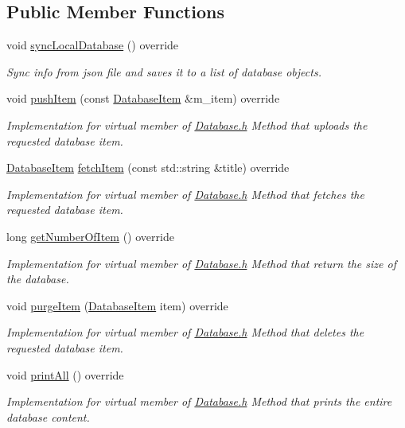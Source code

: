 \subsection*{Public Member Functions}
\begin{DoxyCompactItemize}
\item 
void \hyperlink{classMovieDatabase_aee175db6a2a357b6180fcab5d57eddd5}{sync\+Local\+Database} () override
\begin{DoxyCompactList}\small\item\em Sync info from json file and saves it to a list of database objects. \end{DoxyCompactList}\item 
void \hyperlink{classMovieDatabase_a203b9b5c1b325997ce519859a436b6ce}{push\+Item} (const \hyperlink{classDatabaseItem}{Database\+Item} \&m\+\_\+item) override
\begin{DoxyCompactList}\small\item\em Implementation for virtual member of \hyperlink{Database_8h_source}{Database.\+h} Method that uploads the requested database item. \end{DoxyCompactList}\item 
\hyperlink{classDatabaseItem}{Database\+Item} \hyperlink{classMovieDatabase_ac0bb39b8be599ffea76081809ae42dda}{fetch\+Item} (const std\+::string \&title) override
\begin{DoxyCompactList}\small\item\em Implementation for virtual member of \hyperlink{Database_8h_source}{Database.\+h} Method that fetches the requested database item. \end{DoxyCompactList}\item 
long \hyperlink{classMovieDatabase_a9a386f51dd72d63414a124cbcfcd879b}{get\+Number\+Of\+Item} () override
\begin{DoxyCompactList}\small\item\em Implementation for virtual member of \hyperlink{Database_8h_source}{Database.\+h} Method that return the size of the database. \end{DoxyCompactList}\item 
void \hyperlink{classMovieDatabase_ad3ce59d0fa7f64937085e7504bd3b85a}{purge\+Item} (\hyperlink{classDatabaseItem}{Database\+Item} item) override
\begin{DoxyCompactList}\small\item\em Implementation for virtual member of \hyperlink{Database_8h_source}{Database.\+h} Method that deletes the requested database item. \end{DoxyCompactList}\item 
void \hyperlink{classMovieDatabase_af1e13b6fc0fd7186e98edbe2cf187618}{print\+All} () override
\begin{DoxyCompactList}\small\item\em Implementation for virtual member of \hyperlink{Database_8h_source}{Database.\+h} Method that prints the entire database content. \end{DoxyCompactList}\end{DoxyCompactItemize}
